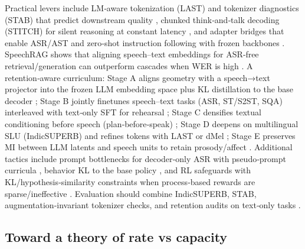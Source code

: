 Practical levers include LM‑aware tokenization (LAST) and tokenizer diagnostics (STAB) that predict downstream quality \cite{turetzky2024lastlanguagemodelawarespeechtokenization,vashishth2024stabspeechtokenizerassessmentbenchmark}, chunked think‑and‑talk decoding (STITCH) for silent reasoning at constant latency \cite{chiang2025stitchsimultaneousthinkingtalkingchunked}, and adapter bridges that enable ASR/AST and zero‑shot instruction following with frozen backbones \cite{wang2023slmbridgethingapbetweenspeechtextfoundat}. SpeechRAG shows that aligning speech–text embeddings for ASR‑free retrieval/generation can outperform cascades when WER is high \cite{min2025speechretrievalaugmentedgenerationwithou}. A retention‑aware curriculum: Stage A aligns geometry with a speech→text projector into the frozen LLM embedding space plus KL distillation to the base decoder \cite{turetzky2024lastlanguagemodelawarespeechtokenization,wang2023slmbridgethingapbetweenspeechtextfoundat,hassid2024textuallypretrainedspeechlanguagemodels}; Stage B jointly finetunes speech–text tasks (ASR, ST/S2ST, SQA) interleaved with text‑only SFT for rehearsal \cite{peng2024mslms2stmultitaskspeechlanguagemodeltext,peng2025voicetextblenderaugmentinglargelanguagem,wang2023slmbridgethingapbetweenspeechtextfoundat}; Stage C densifies textual conditioning before speech (plan‑before‑speak) \cite{cui2025thinkbeforeyoutalkenhancingmeaningfuldia}; Stage D deepens on multilingual SLU (IndicSUPERB) and refines tokens with LAST or dMel \cite{entry2025indicsuperbspeechprocessinguniversalperf,turetzky2024lastlanguagemodelawarespeechtokenization,bai2025dmelspeechtokenizationmadesimple}; Stage E preserves MI between LLM latents and speech units to retain prosody/affect \cite{wang2025bossbeyondsemanticspeech}. Additional tactics include prompt bottlenecks for decoder‑only ASR with pseudo‑prompt curricula \cite{tsunoo2024decoderonlyarchitecturespeechrecognition}, behavior KL to the base policy \cite{wang2024blspemotowardsempatheticlargespeechlangu}, and RL safeguards with KL/hypothesis‑similarity constraints when process‑based rewards are sparse/ineffective \cite{li2025seewossubmissionmlcslmlessonslearnedspee}. Evaluation should combine IndicSUPERB, STAB, augmentation‑invariant tokenizer checks, and retention audits on text‑only tasks \cite{vashishth2024stabspeechtokenizerassessmentbenchmark,entry2025augmentationinvariantdiscreterepresentat,entry2025indicsuperbspeechprocessinguniversalperf}.

\subsection{Toward a theory of rate vs capacity} \label{subsec:Toward a theory of rate vs capacity}

